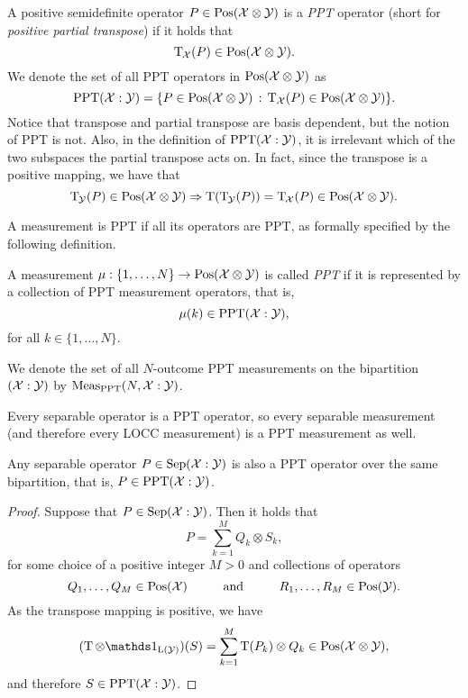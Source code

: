 A positive semidefinite operator $P\in \mathrm{Pos}(\mathcal{X}\otimes\mathcal{Y})$ is a \emph{PPT} operator 
(short for \emph{positive partial transpose}) if it holds that
\begin{equation}
  \operatorname{T}_{\mspace{-1.5mu}\mathcal{X}}(P) \in \mathrm{Pos}(\mathcal{X}\otimes\mathcal{Y}).
\end{equation}
We denote the set of all PPT operators in $\mathrm{Pos}(\mathcal{X}\otimes\mathcal{Y})$ as 
\begin{equation}
\mathrm{PPT}(\mathcal{X}:\mathcal{Y}) = \{ P \in \mathrm{Pos}(\mathcal{X}\otimes\mathcal{Y}) \,:\,
    \operatorname{T}_{\mathcal{X}}(P) \in \mathrm{Pos}(\mathcal{X}\otimes\mathcal{Y}) \}.
\end{equation}
Notice that transpose and partial transpose are basis dependent, but the notion of PPT
is not. Also, in the definition of $\mathrm{PPT}(\mathcal{X}:\mathcal{Y})$, it is irrelevant which of the two subspaces the partial transpose acts on. In fact, since the transpose is a positive mapping, we have that
\begin{equation}
  \operatorname{T}_{\mspace{-1.5mu}\mathcal{Y}}(P) \in \mathrm{Pos}(\mathcal{X}\otimes\mathcal{Y})\Rightarrow
  \operatorname{T}(\operatorname{T}_{\mspace{-1.5mu}\mathcal{Y}}(P)) = \operatorname{T}_{\mspace{-1.5mu}\mathcal{X}}(P) 
    \in \mathrm{Pos}(\mathcal{X}\otimes\mathcal{Y}).
\end{equation}

A measurement is PPT if all its operators are PPT, as formally specified by the following
definition.  
\begin{definition}
\label{def:ppt-measurements}
A measurement $\mu : \{1, \ldots, N\}\rightarrow\mathrm{Pos}(\mathcal{X}\otimes\mathcal{Y})$ is called 
\emph{PPT} if it is represented by a collection
of PPT measurement operators, that is,
\begin{equation}
\mu(k) \in \mathrm{PPT}(\mathcal{X}:\mathcal{Y}),
\end{equation}
for all $k \in \{1,\ldots,N\}$.
\end{definition}

We denote the set of all $N$-outcome PPT measurements on the bipartition 
$(\mathcal{X}:\mathcal{Y})$ by $\mathrm{Meas}_{\mathrm{PPT}}(N, \mathcal{X}:\mathcal{Y})$.

Every separable operator is a PPT operator, so every separable measurement
(and therefore every LOCC measurement) is a PPT measurement as well. 

\begin{prop}
Any separable operator $P \in \mathrm{Sep}(\mathcal{X}:\mathcal{Y})$ is also a PPT operator over the same
bipartition, that is, $P \in \mathrm{PPT}(\mathcal{X}:\mathcal{Y})$.
\end{prop}
\begin{proof}
Suppose that $P \in \mathrm{Sep}(\mathcal{X}:\mathcal{Y})$. Then it holds that
\begin{equation}
  P = \sum_{k = 1}^{M} Q_k \otimes S_k,
\end{equation}
for some choice of a positive integer $M > 0$ and collections of operators 
\begin{equation}
  Q_1,\ldots,Q_M \in \mathrm{Pos}(\mathcal{X})
  \hspace*{1cm}\mbox{and}\hspace*{1cm}
  R_1,\ldots,R_M\in\mathrm{Pos}(\mathcal{Y}).
\end{equation}
As the transpose mapping is positive, we have
\begin{equation}
  (\pt \otimes \I_{\Lin(\Y)})(S) = \sum_{k=1}^{M}\pt(P_{k})\otimes Q_{k} 
    \in \Pos(\X\otimes\Y),
\end{equation}
and therefore $S \in \mathrm{PPT}(\mathcal{X}:\mathcal{Y})$.
\end{proof}


